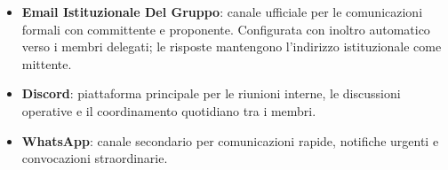 \begin{itemize}
  \item \textbf{Email Istituzionale Del Gruppo}: canale ufficiale per le
        comunicazioni formali con committente e proponente. Configurata con
        inoltro automatico verso i membri delegati; le risposte mantengono
        l'indirizzo istituzionale come mittente.
  \item \textbf{Discord}: piattaforma principale per le riunioni
        interne, le discussioni operative e il coordinamento quotidiano tra i
        membri.
  \item \textbf{WhatsApp}: canale secondario per comunicazioni
        rapide, notifiche urgenti e convocazioni straordinarie.
\end{itemize}
 